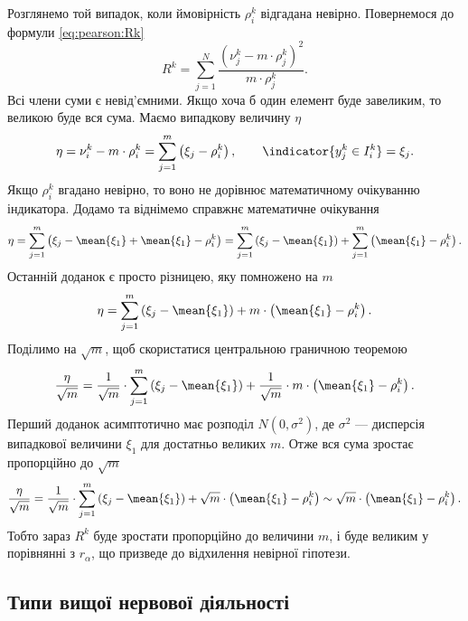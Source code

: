 Розглянемо той випадок, коли ймовірність $\rho_i^k$
відгадана невірно. Повернемося до формули \eqref{eq:pearson:Rk}
\begin{equation*}
  R^k
  = \sum_{j=1}^{N}\frac{\left( \nu_j^k - m \cdot \rho_j^k \right)^2}{m \cdot \rho_j^k}.
\end{equation*}
Всі члени суми є невід’ємними. Якщо хоча б один елемент буде завеликим,
то великою буде вся сума. Маємо випадкову величину $\eta$
\begin{equation*}
  \eta
  = \nu_i^k - m \cdot \rho_i^k
  = \sum_{j=1}^{m} \left( \xi_j - \rho_i^k \right),
  \qquad \indicator{y_j^k \in I_i^k} = \xi_j.
\end{equation*}
Якщо $\rho_i^k$ вгадано невірно, то воно не дорівнює математичному очікуванню
індикатора. Додамо та віднімемо справжнє математичне очікування
\begin{equation*}
  \eta
  = \sum_{j=1}^{m} \left( \xi_j - \mean{\xi_1} + \mean{\xi_1} - \rho_i^k \right)
  = \sum_{j=1}^{m} \left( \xi_j - \mean{\xi_1} \right)
    + \sum_{j=1}^{m} \left( \mean{\xi_1} - \rho_i^k \right).
\end{equation*}
Останній доданок є просто різницею, яку помножено на $m$
\begin{equation*}
  \eta
  = \sum_{j=1}^{m} \left( \xi_j - \mean{\xi_1} \right)
    + m \cdot \left( \mean{\xi_1} - \rho_i^k \right).
\end{equation*}
Поділимо на $\sqrt{m}$, щоб скористатися центральною граничною теоремою
\begin{equation*}
  \frac{\eta}{\sqrt{m}}
  = \frac{1}{\sqrt{m}} \cdot \sum_{j=1}^{m} \left( \xi_j - \mean{\xi_1} \right)
    + \frac{1}{\sqrt{m}} \cdot m \cdot \left( \mean{\xi_1} - \rho_i^k \right).
\end{equation*}
Перший доданок асимптотично має розподіл $N\left( 0, \sigma^2 \right)$, де
$\sigma^2$ --- дисперсія випадкової величини $\xi_1$ для достатньо великих $m$.
Отже вся сума зростає пропорційно до $\sqrt{m}$
\begin{equation*}
  \frac{\eta}{\sqrt{m}}
  = \frac{1}{\sqrt{m}} \cdot \sum_{j=1}^{m} \left( \xi_j - \mean{\xi_1} \right)
    + \sqrt{m} \cdot \left( \mean{\xi_1} - \rho_i^k \right)
  \sim \sqrt{m} \cdot \left( \mean{\xi_1} - \rho_i^k \right).
\end{equation*}
Тобто зараз $R^k$ буде зростати пропорційно до величини
$m$, і буде великим у порівнянні з $r_{\alpha}$, що призведе до відхилення
невірної гіпотези.

\subsection{Типи вищої нервової діяльності}


